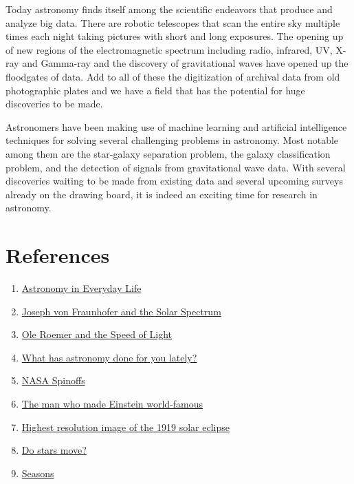 \documentclass{../template/texnote}
\begin{document}
Today astronomy finds itself among the scientific endeavors that produce and analyze big data. There are robotic telescopes that scan the entire sky multiple times each night taking pictures with short and long exposures. The opening up of new regions of the electromagnetic spectrum including radio, infrared, UV, X-ray and Gamma-ray and the discovery of gravitational waves have opened up the floodgates of data. Add to all of these the digitization of archival data from old photographic plates and we have a field that has the potential for huge discoveries to be made. 

Astronomers have been making use of machine learning and artificial intelligence techniques for solving several challenging problems in astronomy. Most notable among them are the star-galaxy separation problem, the galaxy classification problem, and the detection of signals from gravitational wave data. With several discoveries waiting to be made from existing data and several upcoming surveys already on the drawing board, it is indeed an exciting time for research in astronomy.




\section{References}
\begin{enumerate}
    \item \href{https://www.iau.org/public/themes/astronomy_in_everyday_life/#:~:text=The%20fruits%20of%20scientific%20and,solar%20panels%20and%20Magnetic%20Resonance}{Astronomy in Everyday Life}
    \item \href{http://scihi.org/joseph-fraunhofer-solar-spectrum/}{Joseph von Fraunhofer and the Solar Spectrum}
    \item \href{https://www.amnh.org/learn-teach/curriculum-collections/cosmic-horizons-book/ole-roemer-speed-of-light#:~:text=In%201676%2C%20the%20Danish%20astronomer,eclipses%20of%20Jupiter's%20moon%20Io.}{Ole Roemer and the Speed of Light}
    \item \href{https://www.astronomy.ohio-state.edu/nahar.1/papers/astronomy.magazine.may12.pdf}{What has astronomy done for you lately?}
    \item \href{https://spinoff.nasa.gov/}{NASA Spinoffs}
    \item \href{https://www.bbc.com/news/science-environment-48369980}{The man who made Einstein world-famous}
    \item \href{https://www.eso.org/public/images/potw1926a/}{Highest resolution image of the 1919 solar eclipse}
    \item \href{https://phys.org/news/2015-02-stars.html}{Do stars move?}
    \item \href{https://education.nationalgeographic.org/resource/season/}{Seasons}
\end{enumerate}
    \printbibliography
\end{document}
